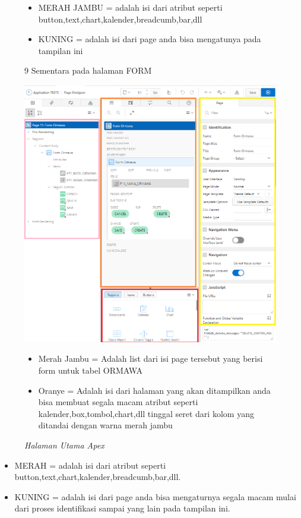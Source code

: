 \begin{itemize}
        \begin{figure}[!htbp]
        \begin{itemize}
            \item MERAH JAMBU = adalah isi dari atribut seperti button,text,chart,kalender,breadcumb,bar,dll
            \item KUNING = adalah isi dari page anda bisa mengatunya pada tampilan ini
        \end{itemize}
        \item[9]Sementara pada halaman FORM
        \begin{center}
        \includegraphics[scale=0.45]{figures/halaman_page_designer_form.png}
        \caption{\textit{Halaman Utama Apex}}
        \end{center}
         \begin{itemize}
            \item  Merah Jambu = Adalah list dari isi page tersebut yang berisi form untuk tabel ORMAWA
            \item  Oranye = Adalah isi dari halaman yang akan ditampilkan anda bisa membuat segala macam atribut seperti kalender,box,tombol,chart,dll tinggal seret dari kolom yang ditandai dengan warna merah jambu
        \end{itemize}
        \end{figure}
        \begin{itemize}
            \item  MERAH = adalah isi dari atribut seperti button,text,chart,kalender,breadcumb,bar,dll.
            \item  KUNING = adalah isi dari page anda bisa mengaturnya segala macam mulai dari proses identifikasi sampai yang lain pada tampilan ini. 
        \end{itemize}
\end{itemize}


